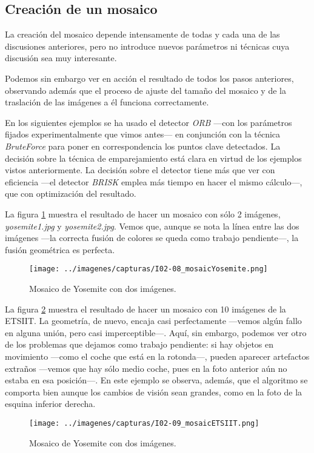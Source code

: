 \documentclass[a4paper, 11pt]{article}
\theoremstyle{definition}
\theoremstyle{theorem}
\begin{document}
    \subsection{Creación de un mosaico}
    La creación del mosaico depende intensamente de todas y cada una de las discusiones anteriores, pero no introduce nuevos parámetros ni técnicas cuya discusión sea muy interesante.

    Podemos sin embargo ver en acción el resultado de todos los pasos anteriores, observando además que el proceso de ajuste del tamaño del mosaico y de la traslación de las imágenes a él funciona correctamente.

    En los siguientes ejemplos se ha usado el detector \emph{ORB} ---con los parámetros fijados experimentalmente que vimos antes--- en conjunción con la técnica \emph{BruteForce} para poner en correspondencia los puntos clave detectados. La decisión sobre la técnica de emparejamiento está clara en virtud de los ejemplos vistos anteriormente. La decisión sobre el detector tiene más que ver con eficiencia ---el detector \emph{BRISK} emplea más tiempo en hacer el mismo cálculo---, que con optimización del resultado.

    La figura \ref{mosaicoY} muestra el resultado de hacer un mosaico con sólo 2 imágenes, \emph{yosemite1.jpg} y \emph{yosemite2.jpg}. Vemos que, aunque se nota la línea entre las dos imágenes ---la correcta fusión de colores se queda como trabajo pendiente---, la fusión geométrica es perfecta.

    \begin{figure}[ht!]
        \centering
        \texttt{[image: ../imagenes/capturas/I02-08\_mosaicYosemite.png]}
        \caption{Mosaico de Yosemite con dos imágenes. \label{mosaicoY}}
    \end{figure}

    La figura \ref{mosaicoE} muestra el resultado de hacer un mosaico con 10 imágenes de la ETSIIT. La geometría, de nuevo, encaja casi perfectamente ---vemos algún fallo en alguna unión, pero casi imperceptible---. Aquí, sin embargo, podemos ver otro de los problemas que dejamos como trabajo pendiente: si hay objetos en movimiento ---como el coche que está en la rotonda---, pueden aparecer artefactos extraños ---vemos que hay sólo medio coche, pues en la foto anterior aún no estaba en esa posición---. En este ejemplo se observa, además, que el algoritmo se comporta bien aunque los cambios de visión sean grandes, como en la foto de la esquina inferior derecha.

    \begin{figure}[ht!]
        \centering
        \texttt{[image: ../imagenes/capturas/I02-09\_mosaicETSIIT.png]}
        \caption{Mosaico de Yosemite con dos imágenes. \label{mosaicoE}}
    \end{figure}
\end{document}
